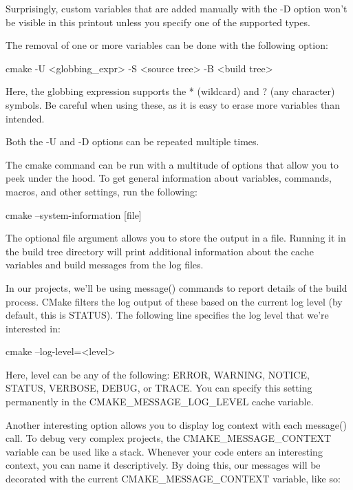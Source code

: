 Surprisingly, custom variables that are added manually with the -D option won’t be visible in this printout unless you specify one of the supported types.

The removal of one or more variables can be done with the following option:

\begin{shell}
cmake -U <globbing_expr> -S <source tree> -B <build tree>
\end{shell}

Here, the globbing expression supports the * (wildcard) and ? (any character) symbols. Be careful when using these, as it is easy to erase more variables than intended.

Both the -U and -D options can be repeated multiple times.


The cmake command can be run with a multitude of options that allow you to peek under the hood. To get general information about variables, commands, macros, and other settings, run the following:

\begin{shell}
cmake --system-information [file]
\end{shell}

The optional file argument allows you to store the output in a file. Running it in the build tree directory will print additional information about the cache variables and build messages from the log files.

In our projects, we’ll be using message() commands to report details of the build process. CMake filters the log output of these based on the current log level (by default, this is STATUS). The following line specifies the log level that we’re interested in:

\begin{shell}
cmake --log-level=<level>
\end{shell}

Here, level can be any of the following: ERROR, WARNING, NOTICE, STATUS, VERBOSE, DEBUG, or TRACE. You can specify this setting permanently in the CMAKE\_MESSAGE\_LOG\_LEVEL cache variable.

Another interesting option allows you to display log context with each message() call. To debug very complex projects, the CMAKE\_MESSAGE\_CONTEXT variable can be used like a stack. Whenever your code enters an interesting context, you can name it descriptively. By doing this, our messages will be decorated with the current CMAKE\_MESSAGE\_CONTEXT variable, like so:

